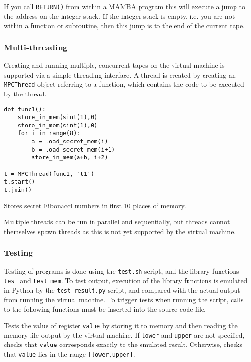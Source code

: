 If you call \verb+RETURN()+ from within a MAMBA program this will
execute a jump to the address on the integer stack.
If the integer stack is empty, i.e. you are not within a function
or subroutine, then this jump is to the end of the current tape.

\subsubsection{Multi-threading}

Creating and running multiple, concurrent tapes on the virtual machine is
supported via a simple threading interface. A thread is created by creating
an \verb|MPCThread| object referring to a function, which contains the code
to be executed by the thread.

\begin{lstlisting}
def func1():
    store_in_mem(sint(1),0)
    store_in_mem(sint(1),0)
    for i in range(8):
        a = load_secret_mem(i)
        b = load_secret_mem(i+1)
        store_in_mem(a+b, i+2)

t = MPCThread(func1, 't1')
t.start()
t.join()
\end{lstlisting}
\begin{footnotesize}
  Stores secret Fibonacci numbers in first 10 places of memory. \\
\end{footnotesize}
Multiple threads can be run in parallel and sequentially, but threads cannot
themselves spawn threads as this is not yet supported by the virtual machine.

\subsubsection{Testing}

Testing of programs is done using the \verb|test.sh| script, and the library
functions \verb|test| and \verb|test_mem|. To test output, execution of the
library functions is emulated in Python by the \verb|test_result.py| script,
and compared with the actual output from running the virtual machine.
To trigger tests when running the script, calls to the following functions
must be inserted into the source code file.

Tests the value of register \verb|value| by storing it to memory and then
reading the memory file output by the virtual machine. If \verb|lower| and
\verb|upper| are
not specified, checks that \verb|value| corresponds exactly to the emulated
result. Otherwise, checks that \verb|value| lies in the range
\verb|[lower,upper]|.

